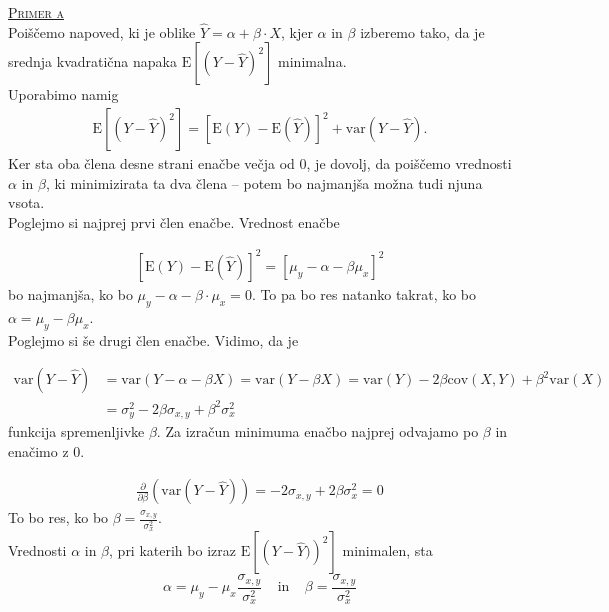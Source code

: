 \documentclass[a4paper,12pt]{article}
\begin{document}
\noindent
\textsc{\underline{Primer a}}
\\
Poiščemo napoved, ki je oblike $\hat{Y} = \alpha + \beta \cdot X$, kjer $\alpha$ in $\beta$ izberemo tako, da je srednja kvadratična napaka $\text{E} \left[ \left( Y - \hat{Y} \right) ^2 \right]$ minimalna.
\\
Uporabimo namig 
\begin{align} 
    \text{E} \left[ \left( Y - \hat{Y} \right) ^2 \right] = \left[ \text{E}(Y) - \text{E}(\hat{Y}) \right]^2 + \text{var}(Y - \hat{Y}).
\end{align}
Ker sta oba člena desne strani enačbe večja od $0$, je dovolj, da poiščemo vrednosti $\alpha$ in $\beta$, ki minimizirata ta dva člena -- potem bo najmanjša možna tudi njuna vsota.
\\
Poglejmo si najprej prvi člen enačbe. Vrednost enačbe

\begin{align*}
    \left[ \text{E}(Y) - \text{E}(\hat{Y}) \right]^2 = \left[ \mu_y - \alpha - \beta \mu_x \right] ^2 
\end{align*}
bo najmanjša, ko bo $ \mu_y - \alpha - \beta \cdot \mu_x = 0$. To pa bo res natanko takrat, ko bo $\alpha = \mu_y - \beta \mu_x$. 
\\
Poglejmo si še drugi člen enačbe. Vidimo, da je 

\begin{align*} 
\text{var}(Y-\hat{Y}) &= \text{var}(Y - \alpha - \beta X) = \text{var}(Y - \beta X) = \text{var}(Y) - 2 \beta \text{cov}(X, Y) + \beta^2 \text{var}(X)
\\
&= \sigma_y^2 - 2 \beta \sigma_{x,y} + \beta^2 \sigma_x^2 
\end{align*}
funkcija spremenljivke $\beta$. Za izračun minimuma enačbo najprej odvajamo po $\beta$ in enačimo z $0$.

\begin{align*}
    \frac{\partial}{\partial \beta} (\text{var}(Y - \hat{Y})) = - 2 \sigma_{x,y} + 2 \beta \sigma_x^2 = 0 
\end{align*}
To bo res, ko bo $ \beta = \frac{\sigma_{x,y}}{\sigma_x^2} $.
\\
Vrednosti $\alpha$ in $\beta$, pri katerih bo izraz $\text{E} \left[ \left( Y - \hat{Y}) \right) ^2 \right]$ minimalen, sta
$$ \alpha = \mu_y - \mu_x \frac{\sigma_{x,y}}{\sigma_x^2} \ \ \ \ \ \text{in} \ \ \ \ \ \beta = \frac{\sigma_{x,y}}{\sigma_x^2} $$
\end{document}
